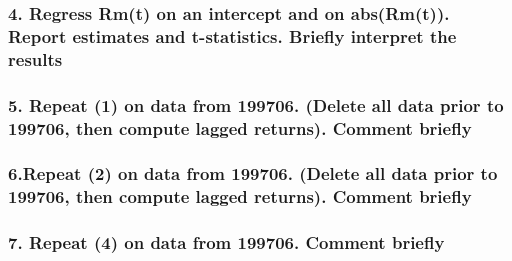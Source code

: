 \documentclass[
]{article}
\begin{document}
\hypertarget{regress-rmt-on-an-intercept-and-on-absrmt.-report-estimates-and-t-statistics.-briefly-interpret-the-results}{%
\subsubsection{4. Regress Rm(t) on an intercept and on abs(Rm(t)).
Report estimates and t-statistics. Briefly interpret the
results}\label{regress-rmt-on-an-intercept-and-on-absrmt.-report-estimates-and-t-statistics.-briefly-interpret-the-results}}

\hypertarget{repeat-1-on-data-from-199706.-delete-all-data-prior-to-199706-then-compute-lagged-returns.-comment-briefly}{%
\subsubsection{5. Repeat (1) on data from 199706. (Delete all data prior
to 199706, then compute lagged returns). Comment
briefly}\label{repeat-1-on-data-from-199706.-delete-all-data-prior-to-199706-then-compute-lagged-returns.-comment-briefly}}

\hypertarget{repeat-2-on-data-from-199706.-delete-all-data-prior-to-199706-then-compute-lagged-returns.-comment-briefly}{%
\subsubsection{6.Repeat (2) on data from 199706. (Delete all data prior
to 199706, then compute lagged returns). Comment
briefly}\label{repeat-2-on-data-from-199706.-delete-all-data-prior-to-199706-then-compute-lagged-returns.-comment-briefly}}

\hypertarget{repeat-4-on-data-from-199706.-comment-briefly}{%
\subsubsection{7. Repeat (4) on data from 199706. Comment
briefly}\label{repeat-4-on-data-from-199706.-comment-briefly}}
\end{document}
